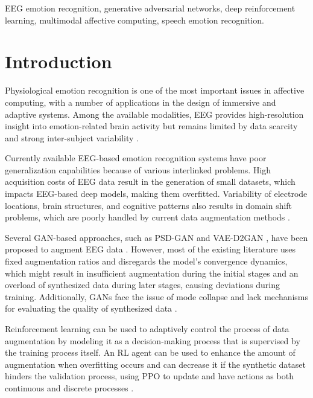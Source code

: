 \documentclass[conference]{IEEEtran}
\begin{document}
\begin{IEEEkeywords}
EEG emotion recognition, generative adversarial networks, deep reinforcement learning, multimodal affective computing, speech emotion recognition.
\end{IEEEkeywords}

\section{Introduction}

Physiological emotion recognition is one of the most important issues in affective computing, with a number of applications in the design of immersive and adaptive systems. Among the available modalities, EEG provides high-resolution insight into emotion-related brain activity but remains limited by data scarcity and strong inter-subject variability \cite{koelstra2012deap,abhang2016book}.

Currently available EEG-based emotion recognition systems have poor generalization capabilities because of various interlinked problems. High acquisition costs of EEG data result in the generation of small datasets, which impacts EEG-based deep models, making them overfitted. Variability of electrode locations, brain structures, and cognitive patterns also results in domain shift problems, which are poorly handled by current data augmentation methods \cite{koelstra2012deap,li2020autoencoder}.

Several GAN-based approaches, such as PSD-GAN \cite{pan2021gan} and VAE-D2GAN \cite{bao2021gan}, have been proposed to augment EEG data \cite{habashi2023gan}. However, most of the existing literature uses fixed augmentation ratios and disregards the model's convergence dynamics, which might result in insufficient augmentation during the initial stages and an overload of synthesized data during later stages, causing deviations during training. Additionally, GANs face the issue of mode collapse and lack mechanisms for evaluating the quality of synthesized data \cite{luo2020augmentation}.

Reinforcement learning can be used to adaptively control the process of data augmentation by modeling it as a decision-making process that is supervised by the training process itself. An RL agent can be used to enhance the amount of augmentation when overfitting occurs and can decrease it if the synthetic dataset hinders the validation process, using PPO to update and have actions as both continuous and discrete processes \cite{zhou2024emotion}.
\end{document}
